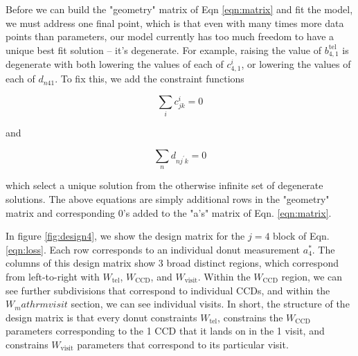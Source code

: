 \documentclass{article}
\begin{document}
Before we can build the "geometry" matrix of Eqn \ref{eqn:matrix} and fit the
model, we must address one final point, which is that even with many times more
data points than parameters, our model currently has too much freedom to have a
unique best fit solution -- it's degenerate.  For example, raising the value of
$b^\mathrm{tel}_{4,1}$ is degenerate with both lowering the values of each of
$c^i_{4,1}$, or lowering the values of each of $d_{n 4 1}$.  To fix this, we
add the constraint functions

\begin{equation}
  \sum_i c^i_{jk} = 0
\end{equation}

and

\begin{equation}
  \sum_{n} d_{n j^\prime k} = 0
\end{equation}

which select a unique solution from the otherwise infinite set of degenerate
solutions.  The above equations are simply additional rows in the "geometry"
matrix and corresponding 0's added to the "a's" matrix of Eqn. \ref{eqn:matrix}.

In figure \ref{fig:design4}, we show the design matrix for the $j=4$ block of
Eqn. \ref{eqn:loss}.  Each row corresponds to an individual donut measurement
$a^*_4$.  The columns of this design matrix show 3 broad distinct regions, which
correspond from left-to-right with $W_\mathrm{tel}$, $W_\mathrm{CCD}$, and
$W_\mathrm{visit}$.  Within the $W_\mathrm{CCD}$ region, we can see further
subdivisions that correspond to individual CCDs, and within the
$W_mathrm{visit}$ section, we can see individual visits.  In short, the
structure of the design matrix is that every donut constraints $W_\mathrm{tel}$,
constrains the $W_\mathrm{CCD}$ parameters corresponding to the 1 CCD that it
lands on in the 1 visit, and constrains $W_\mathrm{visit}$ parameters that
correspond to its particular visit.
\end{document}
